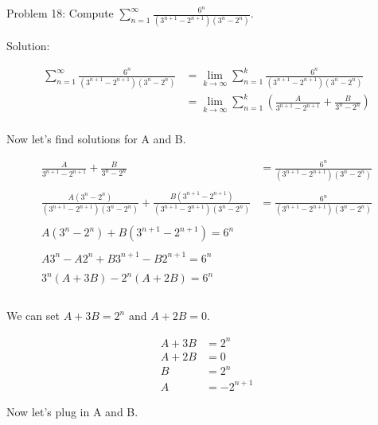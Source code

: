 Problem 18: Compute $\displaystyle\sum_{n=1}^\infty \frac{6^n}{(3^{n+1}-2^{n+1})(3^n-2^n)}$.

Solution:

\begin{align*}
\sum_{n = 1}^{\infty} \frac{6^n}{(3^{n+1} - 2^{n+1})(3^n - 2^n)} &= \lim_{k \rightarrow \infty} \sum_{n = 1}^{k} \frac{6^n}{(3^{n+1} - 2^{n+1})(3^n - 2^n)} \\
&= \lim_{k \rightarrow \infty} \sum_{n = 1}^{k} \left( \frac{A}{3^{n+1} - 2^{n+1}} + \frac{B}{3^n - 2^n} \right) \\
\end{align*}

Now let's find solutions for A and B.

\begin{align*}
\frac{A}{3^{n+1} - 2^{n+1}} + \frac{B}{3^n - 2^n} &= \frac{6^n}{(3^{n+1} - 2^{n+1})(3^n - 2^n)} \\ \\
\frac{A(3^n - 2^n)}{(3^{n+1} - 2^{n+1})(3^n - 2^n)} + \frac{B(3^{n+1} - 2^{n+1}) }{(3^{n+1} - 2^{n+1})(3^n - 2^n)} &= \frac{6^n}{(3^{n+1} - 2^{n+1})(3^n - 2^n)} \\ \\
A(3^n - 2^n) + B(3^{n+1} - 2^{n+1}) = 6^n \\ \\
A3^n - A2^n + B3^{n+1} - B2^{n+1} = 6^n \\ \\
3^n(A + 3B) - 2^n(A + 2B) = 6^n \\ \\
\end{align*}

We can set $A + 3B = 2^n$ and $A + 2B = 0$.

\begin{align*}
A + 3B &= 2^n \\
A + 2B &= 0 \\
B &= 2^n \\
A &= -2^{n+1}
\end{align*}

Now let's plug in A and B.

